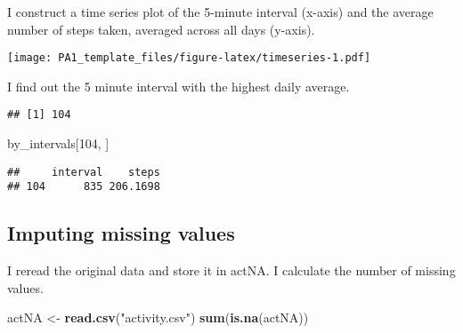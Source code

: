 \documentclass[
]{article}
\newenvironment{Shaded}{\begin{snugshade}}{\end{snugshade}}
\newcommand{\DataTypeTok}[1]{\textcolor[rgb]{0.13,0.29,0.53}{#1}}
\newcommand{\DecValTok}[1]{\textcolor[rgb]{0.00,0.00,0.81}{#1}}
\newcommand{\KeywordTok}[1]{\textcolor[rgb]{0.13,0.29,0.53}{\textbf{#1}}}
\newcommand{\NormalTok}[1]{#1}
\newcommand{\OperatorTok}[1]{\textcolor[rgb]{0.81,0.36,0.00}{\textbf{#1}}}
\newcommand{\StringTok}[1]{\textcolor[rgb]{0.31,0.60,0.02}{#1}}
\begin{document}
I construct a time series plot of the 5-minute interval (x-axis) and the
average number of steps taken, averaged across all days (y-axis).

\begin{Shaded}
\end{Shaded}

\texttt{[image: PA1\_template\_files/figure-latex/timeseries-1.pdf]}

I find out the 5 minute interval with the highest daily average.

\begin{Shaded}
\end{Shaded}

\begin{verbatim}
## [1] 104
\end{verbatim}

\begin{Shaded}
\begin{Highlighting}[]
\NormalTok{by_intervals[}\DecValTok{104}\NormalTok{, ]}
\end{Highlighting}
\end{Shaded}

\begin{verbatim}
##     interval    steps
## 104      835 206.1698
\end{verbatim}

\hypertarget{imputing-missing-values}{%
\subsection{Imputing missing values}\label{imputing-missing-values}}

I reread the original data and store it in actNA. I calculate the number
of missing values.

\begin{Shaded}
\begin{Highlighting}[]
\NormalTok{actNA <-}\StringTok{ }\KeywordTok{read.csv}\NormalTok{(}\StringTok{"activity.csv"}\NormalTok{)}
\KeywordTok{sum}\NormalTok{(}\KeywordTok{is.na}\NormalTok{(actNA))}
\end{Highlighting}
\end{Shaded}
\end{document}
